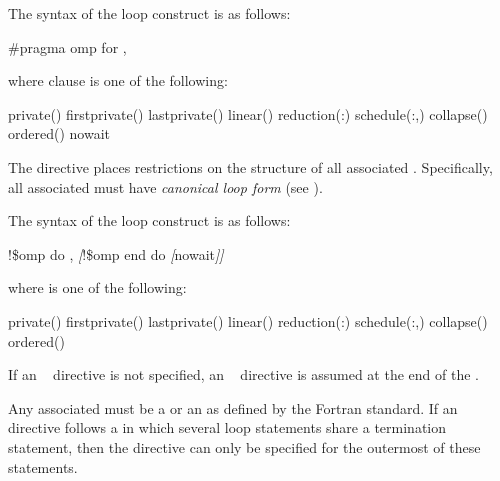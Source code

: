 \syntax
\ccppspecificstart
The syntax of the loop construct is as follows:

\begin{boxedcode}
\#pragma omp for \plc{[clause[ [},\plc{] clause] ... ] new-line} 
\end{boxedcode}

where clause is one of the following: 

\begin{indentedcodelist}
private()
firstprivate()
lastprivate()
linear()
reduction(:)
schedule(\plc{[modifier}:\plc{]kind[},\plc{ chunk\_size]})
collapse()
ordered\plc{[}()\plc{]}
nowait
\end{indentedcodelist}

The  directive places restrictions on the structure of all associated . 
Specifically, all associated  must have \emph{canonical loop form} (see 
).
\ccppspecificend

\fortranspecificstart
The syntax of the loop construct is as follows:

\begin{boxedcode}
!\$omp do \plc{[clause[ [},\plc{] clause] ... ]}
\textsl{[}!\$omp end do \textsl{[}nowait\textsl{]]}
\end{boxedcode}

where  is one of the following:

\begin{indentedcodelist}
private()
firstprivate()
lastprivate()
linear()
reduction(:)
schedule(\plc{[modifier}:\plc{]kind[},\plc{ chunk\_size]})
collapse()
ordered\plc{[}()\plc{]}
\end{indentedcodelist}

If an ~ directive is not specified, an ~ directive is assumed at the end of the 
.

Any associated  must be a  or an
 as defined by the Fortran standard. If
an ~ directive follows a  in
which several loop statements share a  termination statement,
then the directive can only be specified for the outermost of these
 statements.

